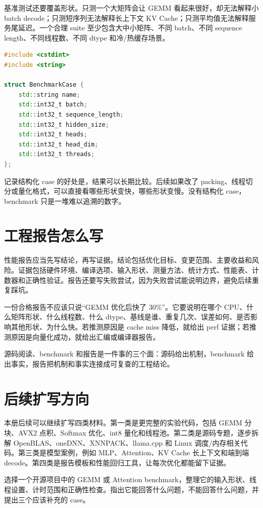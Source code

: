 基准测试还要覆盖形状。只测一个大矩阵会让 GEMM 看起来很好，却无法解释小 batch decode；只测短序列无法解释长上下文 KV Cache；只测平均值无法解释服务尾延迟。一个合理 suite 至少包含大中小矩阵、不同 batch、不同 sequence length、不同线程数、不同 dtype 和冷/热缓存场景。

\begin{lstlisting}[language=C++,caption={Benchmark case 描述应显式记录形状和线程数}]
#include <cstdint>
#include <string>

struct BenchmarkCase {
    std::string name;
    std::int32_t batch;
    std::int32_t sequence_length;
    std::int32_t hidden_size;
    std::int32_t heads;
    std::int32_t head_dim;
    std::int32_t threads;
};
\end{lstlisting}

记录结构化 case 的好处是，结果可以长期比较。后续如果改了 packing、线程切分或量化格式，可以直接看哪些形状变快，哪些形状变慢。没有结构化 case，benchmark 只是一堆难以追溯的数字。

\section{工程报告怎么写}

性能报告应当先写结论，再写证据。结论包括优化目标、变更范围、主要收益和风险。证据包括硬件环境、编译选项、输入形状、测量方法、统计方式、性能表、计数器和正确性验证。报告还要写失败尝试，因为失败尝试能说明边界，避免后续重复踩坑。

一份合格报告不应该只说“GEMM 优化后快了 30\%”。它要说明在哪个 CPU、什么矩阵形状、什么线程数、什么 dtype、基线是谁、重复几次、误差如何、是否影响其他形状、为什么快。若推测原因是 cache miss 降低，就给出 perf 证据；若推测原因是向量化成功，就给出汇编或编译器报告。

\begin{keyidea}
源码阅读、benchmark 和报告是一件事的三个面：源码给出机制，benchmark 给出事实，报告把机制和事实连接成可复查的工程结论。
\end{keyidea}

\section{后续扩写方向}

本册后续可以继续扩写四类材料。第一类是更完整的实验代码，包括 GEMM 分块、AVX2 点积、Softmax 优化、int8 量化和线程池。第二类是源码专题，逐步拆解 OpenBLAS、oneDNN、XNNPACK、llama.cpp 和 Linux 调度/内存相关代码。第三类是模型案例，例如 MLP、Attention、KV Cache 长上下文和端到端 decode。第四类是报告模板和性能回归工具，让每次优化都能留下证据。

\begin{exercisebox}
选择一个开源项目中的 GEMM 或 Attention benchmark，整理它的输入形状、线程设置、计时范围和正确性检查。指出它能回答什么问题，不能回答什么问题，并提出三个应该补充的 case。
\end{exercisebox}
